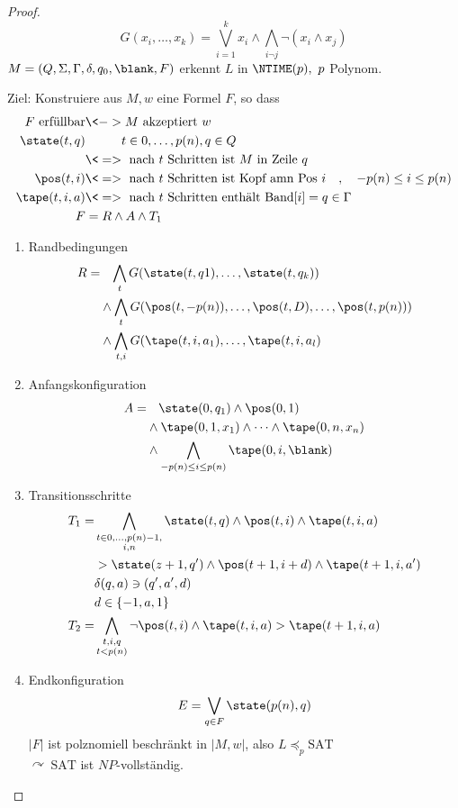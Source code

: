 \begin{proof}
	\[ G(x_i,\dots,x_k) = \bigvee_{i=1}^k x_i\land \bigwedge_{i\neg j}\neg (x_i\land x_j) \]
	$M=(Q,\Sigma,\Gamma,\delta,q_0,\blank,F)$ erkennt $L$ in $\NTIME(p),\ p$ Polynom.
	
	Ziel: Konstruiere aus $M,w$ eine Formel $F$, so dass
	\begin{align*}
		F\text{ erfüllbar} &\<-> M\text{ akzeptiert }w\\
		\state(t,q) &\phantom{\<->} t\in 0,\dots,p(n), q\in Q\\
		&\<=>\text{ nach $t$ Schritten ist $M$ in Zeile }q\\
		\pos(t,i) &\<=>\text{ nach $t$ Schritten ist Kopf amn Pos } i\quad,\quad -p(n)\leq i\leq p(n)\\
		\tape(t,i,a) &\<=>\text{ nach $t$ Schritten enthält Band}[i] = q\in\Gamma\\
		F &= R \land A\land T_1
	\end{align*}
	\begin{enumerate}
	\item Randbedingungen
		\begin{align*}
			R =&\phantom{\land}\, \bigwedge_t G(\state(t,q1),\dots,\state(t,q_k))\\
			& \land \bigwedge_t G(\pos(t,-p(n)),\dots,\pos(t,D),\dots,\pos(t,p(n)))\\
			& \land \bigwedge_{t,i} G(\tape(t,i,a_1),\dots,\tape(t,i,a_l)
		\end{align*}
	\item Anfangskonfiguration
		\begin{align*}
			A =&\phantom{\land}\; \state(0,q_1)\land \pos(0,1)\\
			&\land\tape(0,1,x_1)\land\dots\land\tape(0,n,x_n)\\
			&\land\bigwedge_{-p(n)\leq i\leq p(n)} \tape(0,i,\blank)
		\end{align*}
	\item Transitionsschritte
	\begin{align*}
		T_1 =& \bigwedge_{\substack{t\in 0,\dots,p(n)-1,\\i,n}} \state(t,q)\land \pos(t,i) \land \tape(t,i,a)\\
		&\-> \state(z+1,q')\land \pos(t+1,i+d) \land \tape(t+1,i,a')\\
		&\delta(q,a)\ni(q',a',d)\\
		&d\in\{-1,a,1\}\\
		T_2 =& \bigwedge_{\substack{t,i,q\\t<p(n)}} \neg \pos(t,i)\land \tape(t,i,a) \-> \tape(t+1,i,a)
	\end{align*}
	\item Endkonfiguration
		\[ E = \bigvee_{q\in F} \state(p(n),q) \]
		$|F|$ ist polznomiell beschränkt in $|M,w|$, also $L\preceq_p \mathrm{SAT}$\\
		$\curvearrowright\ \mathrm{SAT}$ ist $NP$-vollständig.
	\end{enumerate}
\end{proof}

